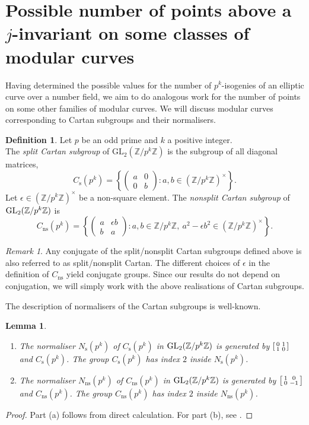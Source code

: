 \documentclass[10pt,leqno]{amsart}
\newcommand\sm[1]{\begin{bsmallmatrix}#1\end{bsmallmatrix}}
\newcommand{\Z}{\mathbb{Z}}
\newcommand{\GL}{\textnormal{GL}}
\newtheorem{lemma}[theorem]{Lemma}
\theoremstyle{definition}
\newtheorem{definition}[theorem]{Definition}
\theoremstyle{remark}
\newtheorem{remark}[theorem]{Remark}
\numberwithin{theorem}{section}
\begin{document}
\section{Possible number of points above a $j$-invariant on some classes of modular curves}\label{sec4}

Having determined the possible values for the number of $p^k$-isogenies of an elliptic curve over a number field, we aim to do analogous work for the number of points on some other families of modular curves. We will discuss modular curves corresponding to Cartan subgroups and their normalisers.

\begin{definition} Let $p$ be an odd prime and $k$ a positive integer. \\ The \emph{split Cartan subgroup} of $\mathrm{GL}_2(\mathbb{Z}/p^k\mathbb{Z})$ is the subgroup of all diagonal matrices, 
$$
C_{\mathrm{s}}(p^k)=\left\{\begin{pmatrix}a&0\\[4pt]0&b\end{pmatrix}:a,b\in (\Z/p^k\Z)^\times\right\}.
$$
Let $\epsilon \in (\Z/p^k\Z)^\times$ be a non-square element. The \emph{nonsplit Cartan subgroup} of $\GL_2(\mathbb{Z}/p^k\mathbb{Z})$ is
$$
C_{\mathrm{ns}}(p^k)
  = \left\{
     \begin{pmatrix}
       a & \epsilon b \\
       b & a
     \end{pmatrix}
     : a,b \in \mathbb{Z}/p^k\mathbb{Z},\ 
       a^2 - \epsilon b^2 \in (\mathbb{Z}/p^k\mathbb{Z})^\times
    \right\}.
$$
\end{definition}
\begin{remark}
    Any conjugate of the split/nonsplit Cartan subgroups defined above is also referred to as split/nonsplit Cartan. The different choices of $\epsilon$ in the definition of $C_{\mathrm{ns}}$ yield conjugate groups. Since our results do not depend on conjugation, we will simply work with the above realisations of Cartan subgroups.
\end{remark}
The description of normalisers of the Cartan subgroups is well-known. 
\begin{lemma} \phantom{a}
    \begin{enumerate}[label=\textnormal{(\alph*)}]
        \item The normaliser $N_{\mathrm s}(p^k)$ of $C_{\mathrm s}(p^k)$ in $\GL_2(\Z/p^k\Z)$ is generated by $\sm{0 & 1 \\ 1 & 0}$ and $C_{\mathrm s}(p^k)$. The group $C_{\mathrm s}(p^k)$ has index $2$ inside $N_{\mathrm s}(p^k)$.
        \item The normaliser $N_{\mathrm{ns}}(p^k)$ of $C_{\mathrm{ns}}(p^k)$ in $\GL_2(\Z/p^k\Z)$ is generated by $\sm{1 & 0 \\ 0 & -1}$ and $C_{\mathrm{ns}}(p^k)$. The group $C_{\mathrm{ns}}(p^k)$ has index $2$ inside $N_{\mathrm{ns}}(p^k)$.
    \end{enumerate}
\end{lemma}
\begin{proof}
    Part (a) follows from direct calculation. For part (b), see \cite[Theorem 1.1]{alvarocm}.
\end{proof}
\end{document}
